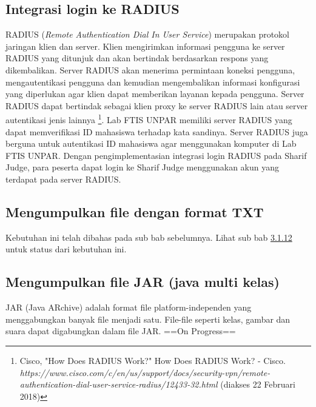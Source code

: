 \subsection{Integrasi login ke RADIUS}
RADIUS (\textit{Remote Authentication Dial In User Service}) merupakan protokol jaringan klien dan server. Klien mengirimkan informasi pengguna ke server RADIUS yang ditunjuk dan akan bertindak berdasarkan respons yang dikembalikan. Server RADIUS akan menerima permintaan koneksi pengguna, mengautentikasi pengguna dan kemudian mengembalikan informasi konfigurasi yang diperlukan agar klien dapat memberikan layanan kepada pengguna. Server RADIUS dapat bertindak sebagai klien proxy ke server RADIUS lain atau server autentikasi jenis lainnya \footnote{Cisco, "How Does RADIUS Work?" How Does RADIUS Work? - Cisco. \textit{https://www.cisco.com/c/en/us/support/docs/security-vpn/remote-authentication-dial-user-service-radius/12433-32.html} (diakses 22 Februari 2018)}. %
Lab FTIS UNPAR memiliki server RADIUS yang dapat memverifikasi ID mahasiswa terhadap kata sandinya. Server RADIUS juga berguna untuk autentikasi ID mahasiswa agar menggunakan komputer di Lab FTIS UNPAR. Dengan pengimplementasian integrasi login RADIUS pada Sharif Judge, para peserta dapat login ke Sharif Judge menggunakan akun yang terdapat pada server RADIUS. 

\subsection{Mengumpulkan file dengan format TXT}
Kebutuhan ini telah dibahas pada sub bab sebelumnya. Lihat sub bab \hyperref[subsec:filetxt]{3.1.12} untuk status dari kebutuhan ini.

\subsection{Mengumpulkan file JAR (java multi kelas)}
JAR (Java ARchive) adalah format file platform-independen yang menggabungkan banyak file menjadi satu. File-file seperti kelas, gambar dan suara dapat digabungkan dalam file JAR. ==On Progress==

